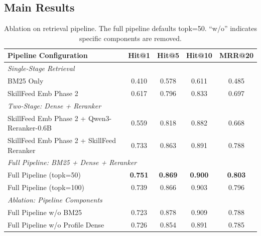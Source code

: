 \documentclass[letterpaper]{article} %
\begin{document}
\subsection{Main Results}
\begin{table}[!h]
\small
\centering
\begin{tabular}{l c c c c}
\toprule
\textbf{Pipeline Configuration} & \textbf{Hit@1} & \textbf{Hit@5} & \textbf{Hit@10} & \textbf{MRR@20} \\
\midrule
\multicolumn{5}{l}{\textit{Single-Stage Retrieval}} \\
BM25 Only & 0.410 & 0.578 & 0.611 & 0.485 \\
SkillFeed Emb Phase 2 & 0.617 & 0.796 & 0.833 & 0.697 \\
\midrule
\multicolumn{5}{l}{\textit{Two-Stage: Dense + Reranker}} \\
SkillFeed Emb Phase 2 + Qwen3-Reranker-0.6B & 0.559 & 0.818 & 0.882 & 0.668 \\
SkillFeed Emb Phase 2 + SkillFeed Reranker & 0.733 & 0.863 & 0.891 & 0.788 \\
\midrule
\multicolumn{5}{l}{\textit{Full Pipeline: BM25 + Dense + Reranker}} \\
Full Pipeline (topk=50) & \textbf{0.751} & \textbf{0.869} & \textbf{0.900} & \textbf{0.803} \\
Full Pipeline (topk=100) & 0.739 & 0.866 & 0.903 & 0.796 \\
\midrule
\multicolumn{5}{l}{\textit{Ablation: Pipeline Components}} \\
Full Pipeline w/o BM25 & 0.723 & 0.878 & 0.909 & 0.788 \\
Full Pipeline w/o Profile Dense & 0.726 & 0.854 & 0.891 & 0.785 \\
\bottomrule
\end{tabular}%
\caption[Ablation on retrieval pipeline.]{Ablation on retrieval pipeline. The full pipeline defaults topk=50. ``w/o'' indicates specific components are removed.}
\label{tab:ablation_pipeline}
\end{table}
% 
\end{document}
